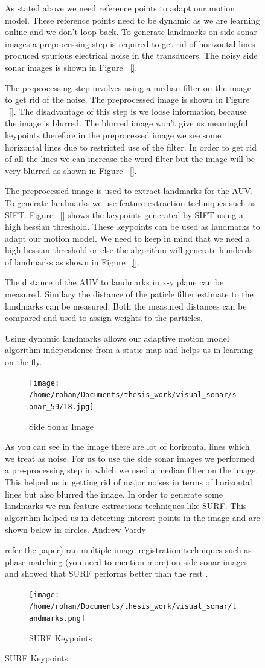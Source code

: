 \documentclass[12pt,draft]{dalcsthesis}
\begin{document}
{{\begin{figure}
As stated above we need reference points to adapt our motion model. These reference points need to be dynamic as we are learning online and we don't loop back. To generate landmarks on side sonar images a preprocessing step is required to get rid of horizontal lines produced spurious electrical noise in the transducers. The noisy side sonar images is shown in Figure ~\ref{}.

The preprocessing step involves using a median filter on the image to get rid of the noise. The preprocessed image is shown in Figure ~\ref{}.
The disadvantage of this step is we loose information because the image is blurred. The blurred image won't give us meaningful keypoints therefore in the preprocessed image we see some horizontal lines due to restricted use of the filter. In order to get rid of all the lines we can increase the {word} filter but the image will be very blurred as shown in Figure ~\ref{}.

The preprocessed image is used to extract landmarks for the AUV. To generate landmarks we use feature extraction techniques such as SIFT. Figure ~\ref{} shows the keypoints generated by SIFT using a high hessian threshold. These keypoints can be used as landmarks to adapt our motion model. We need to keep in mind that we need a high hessian threshold or else the algorithm will generate hunderds of landmarks as shown in Figure ~\ref{}.

The distance of the AUV to landmarks in x-y plane can be measured. Similary the distance of the paticle filter estimate to the landmarks can be measured. Both the measured distances can be compared and used to assign weights to the particles. 

Using dynamic landmarks allows our adaptive motion model algorithm independence from a static map and helps us in learning on the fly.  


\begin{figure}[hbtp]
\caption{Side Sonar Image}
\centering
\texttt{[image: /home/rohan/Documents/thesis\_work/visual\_sonar/sonar\_59/18.jpg]}
\end{figure}
As you can see in the image there are lot of horizontal lines which we treat as noise. For us to use the side sonar images we performed a pre-processing step in which we used a median filter on the image. This helped us in getting rid of major noises in terms of horizontal lines but also blurred the image. In order to generate some landmarks we ran feature extractions techniques like SURF. This algorithm helped us in detecting interest points in the image and are shown below in circles. Andrew Vardy{refer the paper) ran multiple image registration techniques such as phase matching (you need to mention more) on side sonar images and showed that SURF performs better than the rest .
\begin{figure}[hbtp]
\caption{SURF Keypoints}
\centering
\texttt{[image: /home/rohan/Documents/thesis\_work/visual\_sonar/landmarks.png]}
\end{figure}

}
\end{figure}}}
\end{document}
